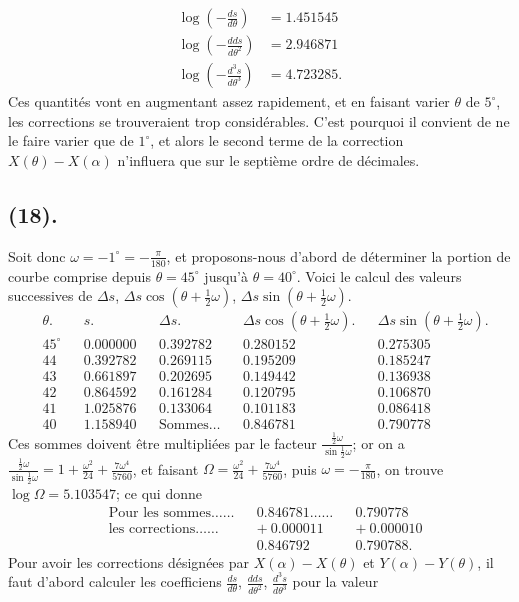 \documentclass{article}
\begin{document}
\[ \begin{aligned} \log\left(-\frac{ds}{d\theta}\right)&=1.451545\\ \log\left(-\frac{dds}{d\theta^{2}}\right)&=2.946871\\ \log\left(-\frac{d^{3}s}{d\theta^{3}}\right)&=4.723285. \end{aligned} \]
Ces quantités vont en augmentant assez rapidement, et en faisant varier $\theta$ de $5^{\circ}$, les corrections se trouveraient trop considérables. C'est pourquoi il convient de ne le faire varier que de $1^{\circ}$, et alors le second terme de la correction $X(\theta)-X(\alpha)$ n'influera que sur le septième ordre de décimales.

\subsection*{(18).}

Soit donc $\omega=-1^{\circ}=-\frac{\pi}{180}$, et proposons-nous d'abord de déterminer la portion de courbe comprise depuis $\theta=45^{\circ}$ jusqu'à $\theta=40^{\circ}$. Voici le calcul des valeurs successives de $\Delta s$, $\Delta s\cos(\theta+\frac{1}{2}\omega)$, $\Delta s\sin(\theta+\frac{1}{2}\omega)$.
\[ \begin{aligned} &\theta. && s. && \Delta s. && \Delta s\cos(\theta+\tfrac{1}{2}\omega). && \Delta s\sin(\theta+\tfrac{1}{2}\omega).\\ &45^{\circ} && 0.000000 && 0.392782 && 0.280152 && 0.275305\\ &44 && 0.392782 && 0.269115 && 0.195209 && 0.185247\\ &43 && 0.661897 && 0.202695 && 0.149442 && 0.136938\\ &42 && 0.864592 && 0.161284 && 0.120795 && 0.106870\\ &41 && 1.025876 && 0.133064 && 0.101183 && 0.086418\\ &40 && 1.158940 && \text{Sommes}\ldots && 0.846781 && 0.790778 \end{aligned} \]
Ces sommes doivent être multipliées par le facteur $\frac{\frac{1}{2}\omega}{\sin\frac{1}{2}\omega}$; or on a $\frac{\frac{1}{2}\omega}{\sin\frac{1}{2}\omega}=1+\frac{\omega^{2}}{24}+\frac{7\omega^{4}}{5760}$, et faisant $\Omega=\frac{\omega^{2}}{24}+\frac{7\omega^{4}}{5760}$, puis $\omega=-\frac{\pi}{180}$, on trouve $\log\Omega=5.103547$; ce qui donne
\[ \begin{aligned} &\text{Pour les sommes}\ldots\ldots && 0.846781\ldots\ldots && 0.790778\\ &\text{les corrections}\ldots\ldots && +\ 0.000011 && +\ 0.000010\\ & && 0.846792 && 0.790788. \end{aligned} \]
Pour avoir les corrections désignées par $X(\alpha)-X(\theta)$ et $Y(\alpha)-Y(\theta)$, il faut d'abord calculer les coefficiens $\frac{ds}{d\theta}$, $\frac{dds}{d\theta^{2}}$, $\frac{d^{3}s}{d\theta^{3}}$ pour la valeur
\end{document}
